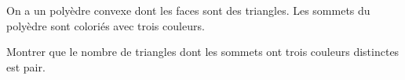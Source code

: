 On a un polyèdre convexe dont les faces sont des triangles. Les sommets du polyèdre sont coloriés avec trois couleurs.

Montrer que le nombre de triangles dont les sommets ont trois couleurs distinctes est pair.